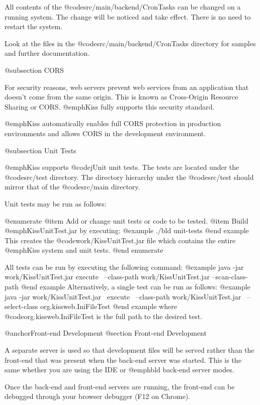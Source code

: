 All contents of the @code{src/main/backend/CronTasks} can be changed
on a running system.  The change will be noticed and take effect.
There is no need to restart the system.

Look at the files in the @code{src/main/backend/CronTasks}
directory for samples and further documentation.

@subsection CORS

For security reasons, web servers prevent web services from
an application that doesn't come from the same origin.  This is
known as Cross-Origin Resource Sharing or CORS.  @emph{Kiss} fully
supports this security standard. 

@emph{Kiss} automatically enables full CORS protection in production
environments and allows CORS in the development environment.

@subsection Unit Tests

@emph{Kiss} supports @code{jUnit} unit tests.  The tests are located
under the @code{src/test} directory.  The directory hierarchy under
the @code{src/test} should mirror that of the @code{src/main}
directory.

Unit tests may be run as follows:

@enumerate
@item
Add or change unit tests or code to be tested.
@item
Build @emph{KissUnitTest.jar} by executing:
@example
    ./bld unit-tests
@end example
This creates the @code{work/KissUnitTest.jar} file which contains
the entire @emph{Kiss} system and unit tests.
@end enumerate

All tests can be run by executing the following command:
@example
java -jar work/KissUnitTest.jar  execute \
  --class-path work/KissUnitTest.jar  --scan-class-path
@end example
Alternatively, a single test can be run as follows:
@example
java -jar work/KissUnitTest.jar \
  execute \
  --class-path work/KissUnitTest.jar \
  --select-class org.kissweb.IniFileTest
@end example
where @code{org.kissweb.IniFileTest} is the full path to the desired test.

@anchor{Front-end Development}
@section Front-end Development

A separate server is used so that development files will be served
rather than the front-end that was present when the back-end server
was started.  This is the same whether you are using the IDE or
@emph{bld} back-end server modes.

Once the back-end and front-end servers are running, the front-end can
be debugged through your browser debugger (F12 on Chrome).

